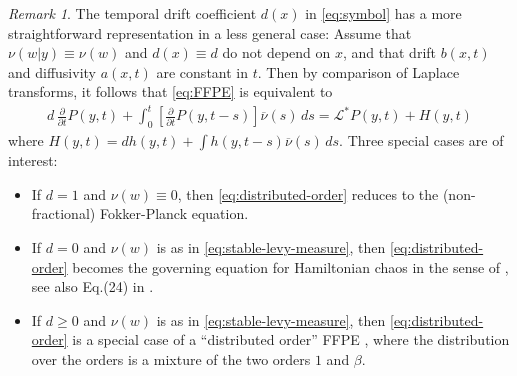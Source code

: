 \documentclass[a4paper,12pt]{elsarticle}
\numberwithin{equation}{section}
\theoremstyle{plain}
\theoremstyle{definition}
\theoremstyle{remark}
\newtheorem{remark}[theorem]{Remark}
\numberwithin{equation}{section}
\newcommand{\1}{\mathbf 1}
\newcommand{\del}{\partial}
\begin{document}
\begin{remark}
The temporal drift coefficient $d(x)$ in \eqref{eq:symbol} has a more
straightforward representation in a less general case:  
Assume that 
$\nu(w|y) \equiv \nu(w)$ and $d(x) \equiv d$ do not depend on $x$, 
and that drift $b(x,t)$ and diffusivity $a(x,t)$ are constant in $t$.  
Then by comparison of Laplace transforms, it follows that \eqref{eq:FFPE}
is equivalent to 
\begin{align} \label{eq:distributed-order}
d\,\frac{\del }{\del t} P(y,t) 
+ \int_0^t \left[\frac{\del }{\del t} P(y,t-s)\right] 
\overline{\nu}(s)\,ds = \mathcal L^* P(y,t) 
+ H(y,t)
\end{align}
where $H(y,t) = dh(y,t) + \int h(y,t-s) \overline \nu(s)\,ds$.
Three special cases are of interest:
\begin{itemize}
\item
If $d=1$ and $\nu(w) \equiv 0$, then \eqref{eq:distributed-order} 
reduces to the (non-fractional) Fokker-Planck equation. 
\item
If $d=0$ and $\nu(w)$ is as in \eqref{eq:stable-levy-measure}, then 
\eqref{eq:distributed-order} becomes the governing equation for 
Hamiltonian chaos in the sense of \cite{Zaslavsky94}, see also 
Eq.(24) in \cite{Baeumer2001}. 
\item
If $d \ge 0$ and $\nu(w)$ is as in 
\eqref{eq:stable-levy-measure}, then 
\eqref{eq:distributed-order} is a special case of a ``distributed order'' 
FFPE \cite{Sandev2015}, where the distribution over the orders 
is a mixture of the two orders $1$ and $\beta$.
\end{itemize}
\end{remark}
\end{document}
